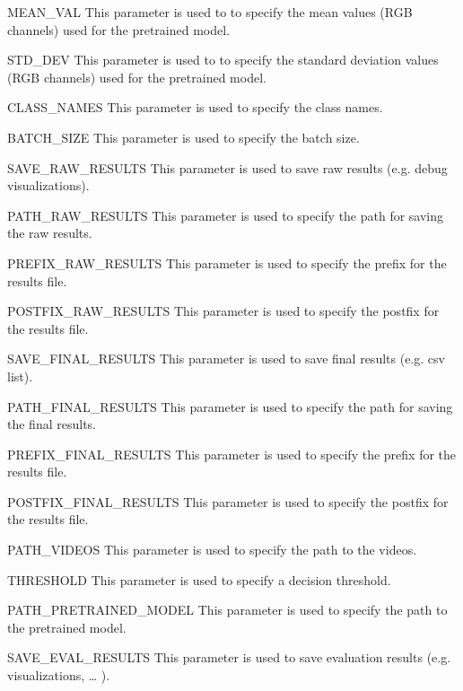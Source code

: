 \documentclass[letterpaper,10pt,english,openany,oneside]{sphinxmanual}
\begin{document}
MEAN\_VAL
This parameter is used to to specify the mean values (RGB channels) used for the pre\sphinxhyphen{}trained model.



STD\_DEV
This parameter is used to to specify the standard deviation values (RGB channels) used for the pre\sphinxhyphen{}trained model.



CLASS\_NAMES
This parameter is used to specify the class names.



BATCH\_SIZE
This parameter is used to specify the batch size.



SAVE\_RAW\_RESULTS
This parameter is used to save raw results (e.g. debug visualizations).



PATH\_RAW\_RESULTS
This parameter is used to specify the path for saving the raw results.



PREFIX\_RAW\_RESULTS
This parameter is used to specify the prefix for the results file.



POSTFIX\_RAW\_RESULTS
This parameter is used to specify the postfix for the results file.



SAVE\_FINAL\_RESULTS
This parameter is used to save final results (e.g. csv list).



PATH\_FINAL\_RESULTS
This parameter is used to specify the path for saving the final results.



PREFIX\_FINAL\_RESULTS
This parameter is used to specify the prefix for the results file.



POSTFIX\_FINAL\_RESULTS
This parameter is used to specify the postfix for the results file.



PATH\_VIDEOS
This parameter is used to specify the path to the videos.



THRESHOLD
This parameter is used to specify a decision threshold.



PATH\_PRETRAINED\_MODEL
This parameter is used to specify the path to the pre\sphinxhyphen{}trained model.



SAVE\_EVAL\_RESULTS
This parameter is used to save evaluation results (e.g. visualizations, … ).
\end{document}
